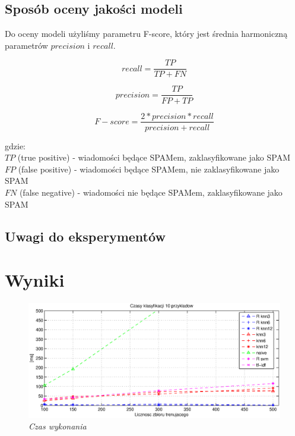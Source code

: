 \documentclass[a4paper, 10pt]{article}
\begin{document}
	\subsection{Sposób oceny jakości modeli}
	
	Do oceny modeli użyliśmy parametru F-score, który jest średnia harmoniczną parametrów $precision$ i $recall$.
	
	
\begin{equation}
recall = \frac{TP}{TP + FN}
\end{equation}

\begin{equation}
precision = \frac{TP}{FP + TP}
\end{equation}

\begin{equation}
{F-score} = \frac{2*precision*recall}{precision + recall}
\end{equation}


gdzie:\\
$TP$ (true positive) - wiadomości będące SPAMem, zaklasyfikowane jako SPAM\\
$FP$ (false positive) - wiadomości będące SPAMem, nie zaklasyfikowane jako SPAM\\
$FN$ (false negative) - wiadomości nie będące SPAMem, zaklasyfikowane jako SPAM\\

	


\subsection{Uwagi do eksperymentów}


\section{Wyniki}

\begin{figure}[ht!]
\centering
\includegraphics[width=165mm]{wykresy/czas500.eps}
\caption{\it{Czas wykonania }}
\label{overflow}
\end{figure}
\end{document}
